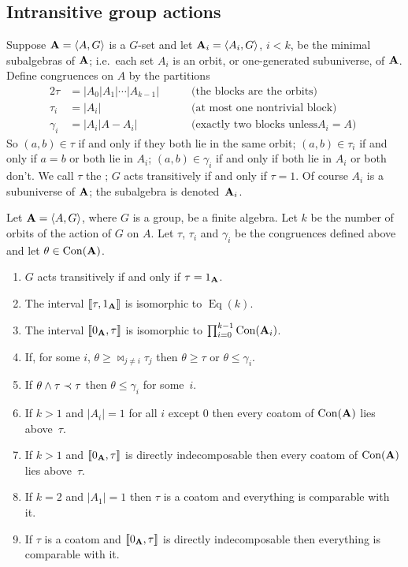 \subsection{Intransitive group actions} 
Suppose $\mathbf{A} = \langle A,G\rangle$ is a $G$-set and let $\mathbf{A}_i = \langle A_i, G\rangle$, $i < k$,
be the minimal subalgebras of $\mathbf{A}$; i.e.~each set $A_i$ is an orbit, or
one-generated subuniverse, of $\mathbf{A}$. Define congruences on $A$ by the 
partitions
\begin{alignat*}{2}
\tau &= |A_0|A_1|\cdots|A_{k-1}| &&\quad\text{ (the blocks are the orbits)} \\
\tau_i &= |A_i| &&\quad\text{ (at most one nontrivial block) }\\
\gamma_i &= |A_i|A - A_i| &&\quad\text{ (exactly two blocks unless
$A_i = A$) }
\end{alignat*}
So $(a,b) \in \tau$ if and only if they both lie in the same orbit;
$(a,b) \in \tau_i$ if and only if $a = b$ or both lie in $A_i$;
$(a,b) \in \gamma_i$ if and only if both lie in $A_i$ or both don't.
We call $\tau$ the ; $G$ acts transitively if and only if $\tau = 1$. 
Of course $A_i$ is a subuniverse of $\mathbf{A}$; the subalgebra
is denoted~$\mathbf{A}_i$.


\begin{theorem}\label{thm:intrans}
Let $\mathbf{A} = \langle A,G\rangle$, where $G$ is a group, be a finite algebra. 
Let $k$ be the number of orbits of the action of $G$ on $A$.
Let $\tau$, $\tau_i$ and $\gamma_i$
be the congruences defined above and let $\theta \in \operatorname{Con}(\mathbf{A})$.
\begin{enumerate}
\item\label{item1}
$G$ acts transitively if and only if $\tau = 1_{\mathbf{A}}$.
\item \label{item2}
The interval $\llbracket\tau,1_{\mathbf{A}}\rrbracket$ is isomorphic to $\operatorname{Eq}(k)$.
\item \label{item3}
The interval $\llbracket 0_{\mathbf{A}},\tau\rrbracket$ is isomorphic to $\prod_{i=0}^{k-1} \operatorname{Con}(\mathbf{A}_i)$.
\item\label{item4}
If, for some $i$, $\theta \ge \Join_{j \ne i} \tau_j$ then $\theta \ge \tau$
or $\theta \le \gamma_i$.
\item\label{item5}
If $\theta\wedge \tau \prec \tau$  then $\theta \le \gamma_i$ for some~$i$.
\item\label{item6}
If $k>1$ and $|A_i| = 1$ for all $i$ except $0$ then every coatom of $\operatorname{Con}(\mathbf{A})$
lies above~$\tau$.
\item\label{item7}
If $k>1$ and $\llbracket 0_{\mathbf{A}},\tau\rrbracket$ is directly indecomposable 
then every coatom of $\operatorname{Con}(\mathbf{A})$ lies above~$\tau$.
\item\label{item8}
If $k = 2$ and $|A_1| = 1$ then $\tau$ is a coatom and 
everything is comparable with it.
\item\label{item9}
If $\tau$ is a coatom and $\llbracket 0_{\mathbf{A}},\tau\rrbracket$ is directly indecomposable
then everything is comparable with it.
\end{enumerate}
\end{theorem}

